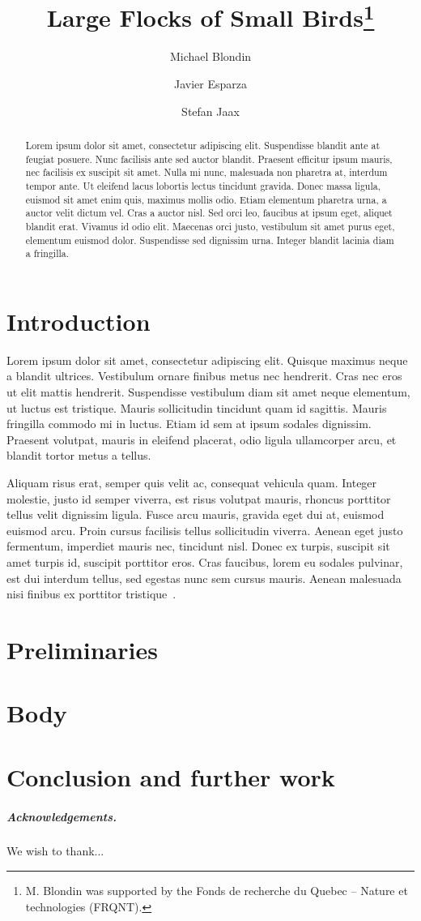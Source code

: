 \documentclass[a4paper,UKenglish]{lipics-v2016}
\title{Large Flocks of Small Birds\footnote{M. Blondin was supported by the Fonds de recherche du Quebec – Nature et technologies (FRQNT).}}
\author[1]{Michael Blondin}
\author[2]{Javier Esparza}
\author[3]{Stefan Jaax}
\affil[1]{Technische Universität München, Munich, Germany\\
  \texttt{blondin@in.tum.de}}
\affil[2]{Technische Universität München, Munich, Germany\\
  \texttt{esparza@in.tum.de}}
\affil[3]{Technische Universität München, Munich, Germany\\
  \texttt{jaax@in.tum.de}}
\begin{document}
\maketitle

\begin{abstract}
  Lorem ipsum dolor sit amet, consectetur adipiscing elit. Suspendisse
  blandit ante at feugiat posuere. Nunc facilisis ante sed auctor
  blandit. Praesent efficitur ipsum mauris, nec facilisis ex suscipit
  sit amet. Nulla mi nunc, malesuada non pharetra at, interdum tempor
  ante. Ut eleifend lacus lobortis lectus tincidunt gravida. Donec
  massa ligula, euismod sit amet enim quis, maximus mollis odio. Etiam
  elementum pharetra urna, a auctor velit dictum vel. Cras a auctor
  nisl. Sed orci leo, faucibus at ipsum eget, aliquet blandit
  erat. Vivamus id odio elit. Maecenas orci justo, vestibulum sit amet
  purus eget, elementum euismod dolor. Suspendisse sed dignissim
  urna. Integer blandit lacinia diam a fringilla.
\end{abstract}

\section{Introduction}

Lorem ipsum dolor sit amet, consectetur adipiscing elit. Quisque
maximus neque a blandit ultrices. Vestibulum ornare finibus metus nec
hendrerit. Cras nec eros ut elit mattis hendrerit. Suspendisse
vestibulum diam sit amet neque elementum, ut luctus est
tristique. Mauris sollicitudin tincidunt quam id sagittis. Mauris
fringilla commodo mi in luctus. Etiam id sem at ipsum sodales
dignissim. Praesent volutpat, mauris in eleifend placerat, odio ligula
ullamcorper arcu, et blandit tortor metus a tellus.

Aliquam risus erat, semper quis velit ac, consequat vehicula
quam. Integer molestie, justo id semper viverra, est risus volutpat
mauris, rhoncus porttitor tellus velit dignissim ligula. Fusce arcu
mauris, gravida eget dui at, euismod euismod arcu. Proin cursus
facilisis tellus sollicitudin viverra. Aenean eget justo fermentum,
imperdiet mauris nec, tincidunt nisl. Donec ex turpis, suscipit sit
amet turpis id, suscipit porttitor eros. Cras faucibus, lorem eu
sodales pulvinar, est dui interdum tellus, sed egestas nunc sem cursus
mauris. Aenean malesuada nisi finibus ex porttitor
tristique~\cite{AADFP04, AAE06, AAER07}.

\section{Preliminaries}

\section{Body}

\section{Conclusion and further work}

\subparagraph*{Acknowledgements.}

We wish to thank...



\clearpage
\appendix

\end{document}
